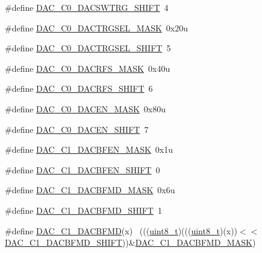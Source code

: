 \begin{DoxyCompactItemize}
\item 
\#define \hyperlink{group___d_a_c___register___masks_ga25e2afd71ee5cc41adde6f072c9d2604}{D\+A\+C\+\_\+\+C0\+\_\+\+D\+A\+C\+S\+W\+T\+R\+G\+\_\+\+S\+H\+I\+FT}~4
\item 
\#define \hyperlink{group___d_a_c___register___masks_gac6dd81bc6500fc4b972c62bde339f31d}{D\+A\+C\+\_\+\+C0\+\_\+\+D\+A\+C\+T\+R\+G\+S\+E\+L\+\_\+\+M\+A\+SK}~0x20u
\item 
\#define \hyperlink{group___d_a_c___register___masks_ga32f43711fa193364231213bd67c989f4}{D\+A\+C\+\_\+\+C0\+\_\+\+D\+A\+C\+T\+R\+G\+S\+E\+L\+\_\+\+S\+H\+I\+FT}~5
\item 
\#define \hyperlink{group___d_a_c___register___masks_gadc1973eafb50599b83de95422477a1f5}{D\+A\+C\+\_\+\+C0\+\_\+\+D\+A\+C\+R\+F\+S\+\_\+\+M\+A\+SK}~0x40u
\item 
\#define \hyperlink{group___d_a_c___register___masks_ga495d0702c9899844340d198120a77e33}{D\+A\+C\+\_\+\+C0\+\_\+\+D\+A\+C\+R\+F\+S\+\_\+\+S\+H\+I\+FT}~6
\item 
\#define \hyperlink{group___d_a_c___register___masks_ga6865b52ae9a9275ef4db48eb3eb5d62a}{D\+A\+C\+\_\+\+C0\+\_\+\+D\+A\+C\+E\+N\+\_\+\+M\+A\+SK}~0x80u
\item 
\#define \hyperlink{group___d_a_c___register___masks_gae8835f0083d5a4e588402a32047e95cb}{D\+A\+C\+\_\+\+C0\+\_\+\+D\+A\+C\+E\+N\+\_\+\+S\+H\+I\+FT}~7
\item 
\#define \hyperlink{group___d_a_c___register___masks_ga61aa82d21d0c84ff4fe42d0856c506bd}{D\+A\+C\+\_\+\+C1\+\_\+\+D\+A\+C\+B\+F\+E\+N\+\_\+\+M\+A\+SK}~0x1u
\item 
\#define \hyperlink{group___d_a_c___register___masks_ga2062351429a9e737c0ac434488b59fe4}{D\+A\+C\+\_\+\+C1\+\_\+\+D\+A\+C\+B\+F\+E\+N\+\_\+\+S\+H\+I\+FT}~0
\item 
\#define \hyperlink{group___d_a_c___register___masks_ga28373e4d9ae322da4f6a37933a340b78}{D\+A\+C\+\_\+\+C1\+\_\+\+D\+A\+C\+B\+F\+M\+D\+\_\+\+M\+A\+SK}~0x6u
\item 
\#define \hyperlink{group___d_a_c___register___masks_ga779629844ed0967b310e7f2721c54624}{D\+A\+C\+\_\+\+C1\+\_\+\+D\+A\+C\+B\+F\+M\+D\+\_\+\+S\+H\+I\+FT}~1
\item 
\#define \hyperlink{group___d_a_c___register___masks_gaacd61446351eecf90f0c04eed83ef08f}{D\+A\+C\+\_\+\+C1\+\_\+\+D\+A\+C\+B\+F\+MD}(x)                                            ~(((\hyperlink{_p_e___types_8h_aba7bc1797add20fe3efdf37ced1182c5}{uint8\+\_\+t})(((\hyperlink{_p_e___types_8h_aba7bc1797add20fe3efdf37ced1182c5}{uint8\+\_\+t})(x))$<$$<$\hyperlink{group___d_a_c___register___masks_ga779629844ed0967b310e7f2721c54624}{D\+A\+C\+\_\+\+C1\+\_\+\+D\+A\+C\+B\+F\+M\+D\+\_\+\+S\+H\+I\+FT}))\&\hyperlink{group___d_a_c___register___masks_ga28373e4d9ae322da4f6a37933a340b78}{D\+A\+C\+\_\+\+C1\+\_\+\+D\+A\+C\+B\+F\+M\+D\+\_\+\+M\+A\+SK})
$$
\end{DoxyCompactItemize}
